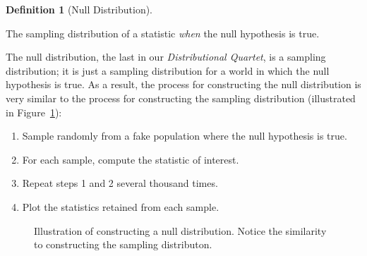 \documentclass[
  letterpaper,
  DIV=11,
  numbers=noendperiod]{scrreprt}
\providecommand{\tightlist}{%
  \setlength{\itemsep}{0pt}\setlength{\parskip}{0pt}}\usepackage{longtable,booktabs,array}
\theoremstyle{definition}
\newtheorem{definition}{Definition}[chapter]
\theoremstyle{definition}
\theoremstyle{plain}
\theoremstyle{remark}
\begin{document}
\begin{definition}[Null
Distribution]\protect\hypertarget{def-null-distribution}{}\label{def-null-distribution}

The sampling distribution of a statistic \emph{when} the null hypothesis
is true.

\end{definition}

The null distribution, the last in our \emph{Distributional Quartet}, is
a sampling distribution; it is just a sampling distribution for a world
in which the null hypothesis is true. As a result, the process for
constructing the null distribution is very similar to the process for
constructing the sampling distribution (illustrated in
Figure~\ref{fig-nulldistns-null-distribution}):

\begin{enumerate}
\def\labelenumi{\arabic{enumi}.}
\tightlist
\item
  Sample randomly from a fake population where the null hypothesis is
  true.
\item
  For each sample, compute the statistic of interest.
\item
  Repeat steps 1 and 2 several thousand times.
\item
  Plot the statistics retained from each sample.
\end{enumerate}

\begin{figure}


\caption{\label{fig-nulldistns-null-distribution}Illustration of
constructing a null distribution. Notice the similarity to constructing
the sampling distributon.}

\end{figure}%
\end{document}
